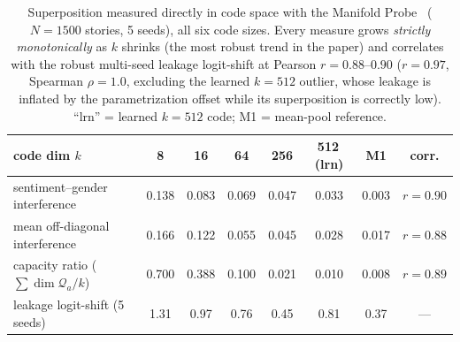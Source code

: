 \documentclass[11pt]{article}
\begin{document}
\begin{table}[h]\centering\small
\begin{tabular}{l cccccc c}
code dim $k$ & 8 & 16 & 64 & 256 & 512\,(lrn) & M1 & corr. \\
\hline
sentiment--gender interference & 0.138 & 0.083 & 0.069 & 0.047 & 0.033 & 0.003 & $r{=}0.90$ \\
mean off-diagonal interference & 0.166 & 0.122 & 0.055 & 0.045 & 0.028 & 0.017 & $r{=}0.88$ \\
capacity ratio ($\sum\!\dim\mathcal{Q}_a/k$) & 0.700 & 0.388 & 0.100 & 0.021 & 0.010 & 0.008 & $r{=}0.89$ \\
\hline
leakage logit-shift (5 seeds)  & 1.31 & 0.97 & 0.76 & 0.45 & 0.81 & 0.37 & --- \\
\end{tabular}
\caption{Superposition measured directly in code space with the Manifold
Probe~\cite{manifold2026} ($N{=}1500$ stories, 5 seeds), all six code sizes.
Every measure grows \emph{strictly monotonically} as $k$ shrinks (the most robust
trend in the paper) and correlates with the robust multi-seed leakage logit-shift
at Pearson $r{=}0.88\text{--}0.90$ ($r{=}0.97$, Spearman $\rho{=}1.0$, excluding the
learned $k{=}512$ outlier, whose leakage is inflated by the parametrization offset
while its superposition is correctly low). ``lrn'' = learned $k{=}512$ code; M1 =
mean-pool reference.}
\label{tab:superpos}
\end{table}
\end{document}
